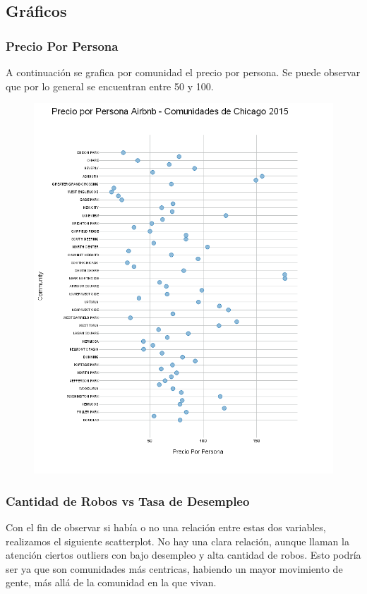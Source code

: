\documentclass[9pt]{article}
\begin{document}
\subsection{Gr\'aficos}
\subsubsection{Precio Por Persona}
A continuaci\'on se grafica por comunidad el precio por persona. Se puede observar que por lo general se encuentran entre 50 y 100.
\begin{figure}[H]
    \centering

    \includegraphics[width=\textwidth]{Graficos Chicago/prercio por persona.png}
\end{figure}
\subsubsection{Cantidad de Robos vs Tasa de Desempleo}
Con el fin de observar si hab\'ia o no una relaci\'on entre estas dos variables, realizamos el siguiente scatterplot. No hay una clara relaci\'on, aunque llaman la atenci\'on ciertos outliers con bajo desempleo y alta cantidad de robos. Esto podr\'ia ser ya que son comunidades m\'as centricas, habiendo un mayor movimiento de gente, m\'as all\'a de la comunidad en la que vivan. 
\end{document}
